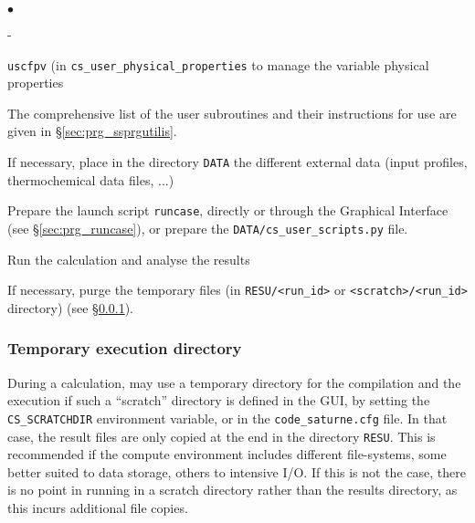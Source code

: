 {{{\begin{list}{$\bullet$}{}
\begin{list}{}{}
\begin{list}{}{}
\begin{list}{-}{}

           \item \texttt{uscfpv} (in \texttt{cs\_user\_physical\_properties}
                  to manage the variable physical properties

        \end{list}
    \end{list}

\end{list}


The comprehensive list of the user subroutines and their instructions
      for use are given in \S\ref{sec:prg_ssprgutilis}.

\item If necessary, place in the directory \texttt{DATA} the different
      external data (input profiles, thermochemical data files, ...)

\item Prepare the launch script \texttt{runcase}, directly or through the
      Graphical Interface (see \S\ref{sec:prg_runcase}), or prepare the
      \texttt{DATA/cs\_user\_scripts.py} file.

\item Run the calculation and analyse the results

\item If necessary, purge the temporary files (in \texttt{RESU/<run\_id>} or
      \texttt{<scratch>/<run\_id>} directory) (see \S\ref{sec:prg_temporarydirectory}).
\end{list}


\subsubsection{Temporary execution directory}
\label{sec:prg_temporarydirectory}%
During a calculation, \CS may use a temporary directory for the compilation and
the execution if such a ``scratch'' directory is defined in the GUI, by setting the
\texttt{CS\_SCRATCHDIR} environment variable, or in the \texttt{code\_saturne.cfg} file.
In that case, the result files are only copied at the end in the directory
\texttt{RESU}. This is recommended if the compute environment includes different
file-systems, some better suited to data storage, others to intensive I/O.
If this is not the case, there is no point in running in a scratch directory
rather than the results directory, as this incurs additional file copies.

}}}
